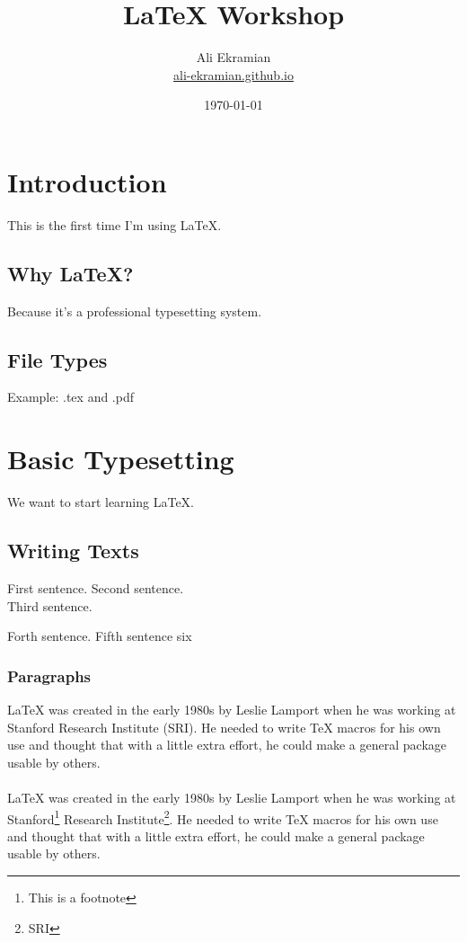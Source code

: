 \documentclass[12pt]{article}
\title{\textbf{LaTeX Workshop}}
\author{Ali Ekramian\\ \url{ali-ekramian.github.io}}
\date{\today}
\begin{document}
	\maketitle
	\pagebreak
	\tableofcontents
	\pagebreak
	
	\section{Introduction}
	This is the first time I'm using \LaTeX.
	
	\subsection{Why LaTeX?}
	Because it's a professional typesetting system.
	\subsection{File Types}
	Example: .tex and .pdf
	
	\section{Basic Typesetting}
	We want to start learning LaTeX.
	\subsection{Writing Texts}
	First sentence. Second sentence. \\ Third sentence.
	
	Forth sentence. \quad Fifth sentence \qquad six
	\subsubsection{Paragraphs}
	LaTeX was created in the early 1980s by Leslie Lamport when he was \linebreak working at Stanford Research Institute (SRI). He needed to write TeX macros for his own use and thought that with a little extra effort, he could make a general package usable by others. \\\\
	 LaTeX was created in the early 1980s by Leslie Lamport when he was working at Stanford\footnote{This is a footnote} Research Institute\footnote{SRI}. He needed to write TeX macros for his own use and thought that with a little extra effort, he could make a general package usable by others.
	
\end{document}
